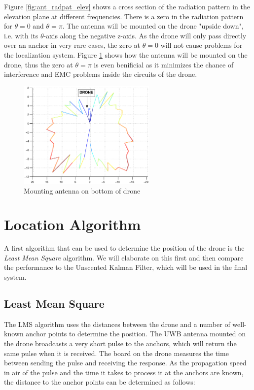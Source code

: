 \documentclass[a4paper]{article}        %
\begin{document}
			Figure \ref{fig:ant_radpat_elev} shows a cross section of the radiation pattern in the elevation plane at different frequencies. There is a zero in the radiation pattern for $\theta=0$ and $\theta=\pi$. The antenna will be mounted on the drone "upside down", i.e. with its $\theta$-axis along the negative z-axis. As the drone will only pass directly over an anchor in very rare cases, the zero at $\theta=0$ will not cause problems for the localization system. Figure \ref{fig:mount_antenna} shows how the antenna will be mounted on the drone, thus the zero at $\theta=\pi$ is even benificial as it minimizes the chance of interference and EMC problems inside the circuits of the drone. 

		\begin{figure}[H]
			\centering
			\includegraphics[width=0.6\textwidth]{images/antenna/mount_antenna}
			\caption{Mounting antenna on bottom of drone}
			\label{fig:mount_antenna}
		\end{figure}

\section{Location Algorithm}
	A first algorithm that can be used to determine the position of the drone is the \textit{Least Mean Square} algorithm. We will elaborate on this first and then compare the performance to the Unscented Kalman Filter, which will be used in the final system. 

	\subsection{Least Mean Square}
	\label{subsec:LMS}

		The LMS algorithm uses the distances between the drone and a number of well-known anchor points to determine the position. The UWB antenna mounted on the drone broadcasts a very short pulse to the anchors, which will return the same pulse when it is received. The board on the drone measures the time between sending the pulse and receiving the response. As the propagation speed in air of the pulse and the time it takes to process it at the anchors are known, the distance to the anchor points can be determined as follows:
\end{document}
